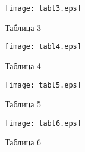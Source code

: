 \documentclass[12pt,a4paper]{scrartcl}
\begin{document}
 \begin{figure}[h!]  
	\centering
	\texttt{[image: tabl3.eps]} %
	\caption{Таблица 3} 

\end{figure}

 \begin{figure}[h!]  
	\centering
	\texttt{[image: tabl4.eps]} %
	\caption{Таблица 4} 

\end{figure}

 \begin{figure}[h!]  
	\centering
	\texttt{[image: tabl5.eps]} %
	\caption{Таблица 5} 
	
\end{figure}

 \begin{figure}[h!]  
	\centering
	\texttt{[image: tabl6.eps]} %
	\caption{Таблица 6} 

\end{figure}
\end{document}
